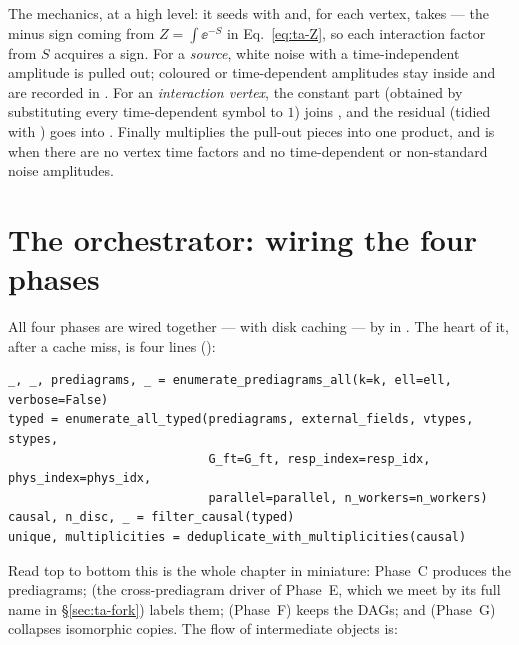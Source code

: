 The mechanics, at a high level: it seeds  with 
and, for each vertex, takes  --- the minus
sign coming from $Z = \int \ee^{-S}$ in Eq.~\eqref{eq:ta-Z}, so each interaction
factor from $S$ acquires a sign. For a \emph{source}, white noise with a
time-independent amplitude is pulled out; coloured or time-dependent amplitudes
stay inside and are recorded in . For an
\emph{interaction vertex}, the constant part (obtained by substituting every
time-dependent symbol to $1$) joins , and the residual
 (tidied with )
goes into . Finally
 multiplies the
pull-out pieces into one product, and  is  when
there are no vertex time factors and no time-dependent or non-standard noise
amplitudes.

\section{The orchestrator: wiring the four phases}\label{sec:ta-orchestrator}

All four phases are wired together --- with disk caching --- by
 in . The heart of
it, after a cache miss, is four lines
():

\begin{lstlisting}
_, _, prediagrams, _ = enumerate_prediagrams_all(k=k, ell=ell, verbose=False)
typed = enumerate_all_typed(prediagrams, external_fields, vtypes, stypes,
                            G_ft=G_ft, resp_index=resp_idx, phys_index=phys_idx,
                            parallel=parallel, n_workers=n_workers)
causal, n_disc, _ = filter_causal(typed)
unique, multiplicities = deduplicate_with_multiplicities(causal)
\end{lstlisting}

Read top to bottom this is the whole chapter in miniature: Phase~C produces the
prediagrams;  (the cross-prediagram driver of Phase~E,
which we meet by its full name  in \S\ref{sec:ta-fork})
labels them;  (Phase~F) keeps the DAGs; and
 (Phase~G) collapses isomorphic copies.
The flow of intermediate objects is:

